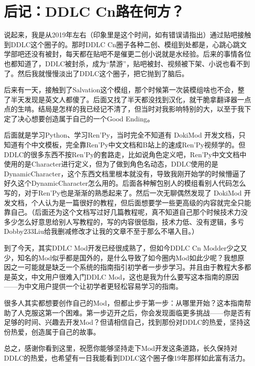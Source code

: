 \chapter*{后记：DDLC Cn路在何方？}

说起来，我是从2019年左右（印象里是这个时间，如有错误请指出）通过贴吧接触到DDLC这个圈子的。那时DDLC Cn圈子各种二创、模组到处都是，心跳心跳文学部吧还没有被封，每天都在贴吧不是催更二创小说就是水经验。后来的事情各位也都知道了，DDLC被封杀，成为“禁游”，贴吧被封、视频被下架、小说也看不到了。然后我就慢慢淡出了DDLC这个圈子，把它抛到了脑后。


后来有一天，接触到了Salvation这个模组，那个时候第一次装模组啥也不会，整了半天发现是英文人都傻了。后面又找了半天都没找到汉化，就干脆拿翻译器一点点的生啃。结局是怎样的我已经记不清了，但当时对我影响特别的大，以至于我下定了决心想要创造属于自己的一个Good Ending。


后面就是学习Python、学习Ren'Py，当时完全不知道有 DokiMod 开发文档，只知道有个中文模板，完全靠Ren'Py中文文档和B站上的速成Ren'Py视频学的。但DDLC的很多东西不按Ren'Py的套路走，比如说角色定义吧，Ren'Py中文文档中使用的是Character进行定义，但为了做到角色名动态，DDLC使用的是DynamicCharacter，这个东西文档里根本就没有，导致我刚开始学的时候懵逼了好久这个DynamicCharacter怎么用的。后面各种解包别人的模组看别人代码怎么写的，对于Ren'Py也是渐渐的熟悉起来了。然后一次无聊偶然发现了 DokiMod 开发文档，个人认为是一篇很好的教程，但后面想要学一些更高级的内容就完全只能靠自己。（后面还为这个文档写过好几篇教程呢，真不知道自己那个时候技术力没多少怎么好意思给别人写教程的，写的内容很低脂，技术力低、没有逻辑，多亏Dobby233Liu给我删减修改才让我的文章不至于那么不堪入目。）


到了今天，其实DDLC Mod开发已经很成熟了，但如今DDLC Cn Modder少之又少，知名的Mod似乎都是国外的，是什么导致了如今圈内Mod如此少呢？我想原因之一可能就是缺乏一个系统的指南指引初学者一步步学习。并且由于教程大多都是英文，中文用户很难入门DDLC Mod，这也是我为什么要写这本指南的原因——为中文用户提供一个让初学者更轻松容易学习的指南。

很多人其实都想要创作自己的Mod，但都止步于第一步：从哪里开始？这本指南帮助了人克服这第一个困难。第一步迈开之后，你会发现面临更多挑战——你是否有足够的时间、兴趣去开发Mod？但请相信自己，找到那份对DDLC的热爱，坚持这份热爱，创造属于自己的故事。

总之，感谢你看到这里，祝愿你能够坚持走下Mod开发这条道路，长久保持对DDLC的热爱，也希望有一日我能看到DDLC这个圈子像19年那样如此富有活力。